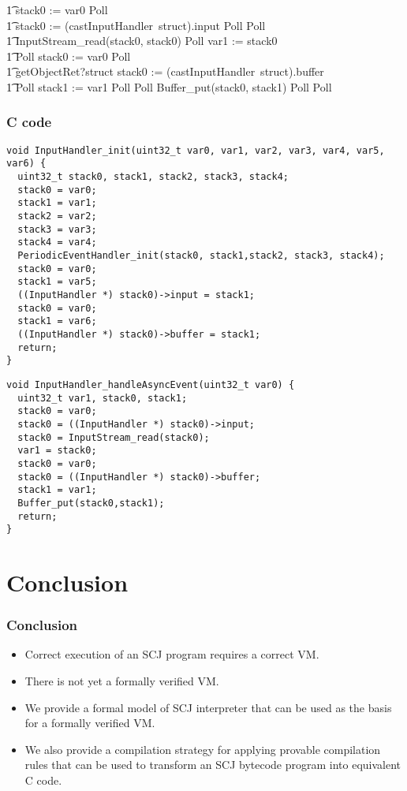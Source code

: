\documentclass{beamer}
\begin{document}
\begin{frame}[shrink]
\begin{circus}
    \t1 stack0 := var0 \circseq Poll  \\
    \t1 {\color{red} stack0 := (castInputHandler~struct).input} \circseq Poll \circseq Poll \circseq \\
    \t1 InputStream\_read(stack0, stack0) \circseq Poll \circseq var1 := stack0 \circseq \\
    \t1 Poll \circseq stack0 := var0 \circseq Poll  \\
    \t1 {\color{red} getObjectRet?struct \then stack0 := (castInputHandler~struct).buffer} \circseq \\
    \t1 Poll \circseq stack1 := var1 \circseq Poll \circseq Poll \circseq Buffer\_put(stack0, stack1) \circseq Poll \circseq Poll
  \end{circus}
\end{frame}

\begin{frame}
  \frametitle{C code}
\begin{lstlisting}
void InputHandler_init(uint32_t var0, var1, var2, var3, var4, var5, var6) {
  uint32_t stack0, stack1, stack2, stack3, stack4;
  stack0 = var0;
  stack1 = var1;
  stack2 = var2;
  stack3 = var3;
  stack4 = var4;
  PeriodicEventHandler_init(stack0, stack1,stack2, stack3, stack4);
  stack0 = var0;
  stack1 = var5;
  ((InputHandler *) stack0)->input = stack1;
  stack0 = var0;
  stack1 = var6;
  ((InputHandler *) stack0)->buffer = stack1;
  return;
}
\end{lstlisting}
\begin{lstlisting}
void InputHandler_handleAsyncEvent(uint32_t var0) {
  uint32_t var1, stack0, stack1;
  stack0 = var0;
  stack0 = ((InputHandler *) stack0)->input;
  stack0 = InputStream_read(stack0);
  var1 = stack0;
  stack0 = var0;
  stack0 = ((InputHandler *) stack0)->buffer;
  stack1 = var1;
  Buffer_put(stack0,stack1);
  return;
}
\end{lstlisting}
\end{frame}


\section{Conclusion}

\begin{frame}
  \frametitle{Conclusion}
  \begin{itemize}
  \item Correct execution of an SCJ program requires a correct VM.
  \item There is not yet a formally verified VM.
  \item We provide a formal model of SCJ interpreter that can be
    used as the basis for a formally verified VM.
  \item We also provide a compilation strategy for applying provable
    compilation rules that can be used to transform an SCJ bytecode
    program into equivalent C code.
  \end{itemize}
\end{frame}
\end{document}
